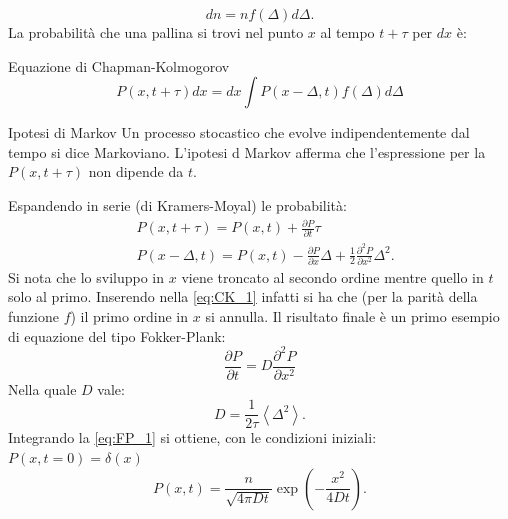 \[
    dn = n f(\Delta) d\Delta
.\] 
La probabilità che una pallina si trovi nel punto $x$ al tempo $t+\tau$ per $dx$ è:
\begin{greenbox}{Equazione di Chapman-Kolmogorov}
 \begin{equation}
    P(x,t+\tau) dx = dx \int P(x-\Delta,t) f(\Delta) d\Delta \label{eq:CK_1}
\end{equation}
\end{greenbox}
\noindent
\begin{redbox}{Ipotesi di Markov}
    Un processo stocastico che evolve indipendentemente dal tempo si dice Markoviano. L'ipotesi d Markov afferma che l'espressione per la $P(x, t + \tau)$ non dipende da $t$.
\end{redbox}
\noindent
Espandendo in serie (di Kramers-Moyal) le probabilità:
\[\begin{aligned}
    &P(x, t+\tau) = P(x, t) + \frac{\partial P}{\partial t} \tau  \\
    & P(x-\Delta,t) = P(x,t) - \frac{\partial P}{\partial x} \Delta  + \frac{1}{2}\frac{\partial ^2 P}{\partial x^2} \Delta^2
.\end{aligned}\]
Si nota che lo sviluppo in $x$ viene troncato al secondo ordine mentre quello in $t$ solo al primo.
Inserendo nella \ref{eq:CK_1} infatti si ha che (per la parità della funzione $f$) il primo ordine in $x$ si annulla. Il risultato finale è un primo esempio di equazione del tipo Fokker-Plank:
\begin{equation}
    \frac{\partial P}{\partial t} = D \frac{\partial ^2P}{\partial x^2} \label{eq:FP_1}
\end{equation}
Nella quale $D$ vale:
\[
    D = \frac{1}{2\tau}\left<\Delta^2\right>
.\]    
Integrando la \ref{eq:FP_1} si ottiene, con le condizioni iniziali: $P(x,t=0) = \delta(x)$
\[
    P(x,t) = \frac{n}{\sqrt{4\pi Dt}}\exp\left(-\frac{x^2}{4Dt}\right)   
.\] 
